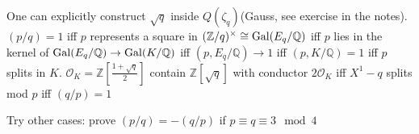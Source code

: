 \documentclass[main]{subfiles}
\begin{document}
One can explicitly construct $\sqrt{q}$ inside $Q(\zeta_q)$(Gauss, see exercise in the notes). $(p/q)=1$ iff $p$ represents a square in $(\mathbb Z/q)^\times\cong\operatorname{Gal}(E_q/\mathbb Q)$ iff $p$ lies in the kernel of $\operatorname{Gal}(E_q/\mathbb Q)\to \operatorname{Gal}(K/\mathbb Q)$ iff $(p,E_q/\mathbb Q)\to1$ iff $(p,K/\mathbb Q)=1$ iff $p$ splits in $K$. $\mathcal O_K=\mathbb Z[\frac{1+\sqrt{q}}{2}]$ contain $\mathbb Z[\sqrt{q}]$ with conductor $2\mathcal O_K$ iff $X^1-q$ splits mod $p$ iff $(q/p)=1$

\begin{exercise}
Try other cases: prove $(p/q)=-(q/p)$ if $p\equiv q\equiv3\mod4$
\end{exercise}
\end{document}

